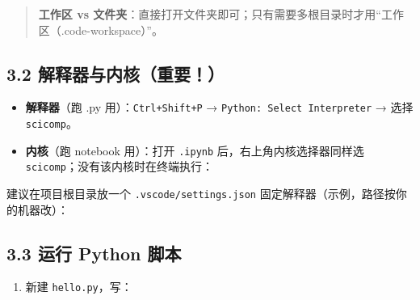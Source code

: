 \begin{quote}
\textbf{工作区 vs
文件夹}：直接打开文件夹即可；只有需要多根目录时才用``工作区（.code-workspace）''。
\end{quote}

\subsection{3.2
解释器与内核（重要！）}\label{ux89e3ux91caux5668ux4e0eux5185ux6838ux91cdux8981}

\begin{itemize}
\tightlist
\item
  \textbf{解释器}（跑 .py 用）：\texttt{Ctrl+Shift+P} →
  \texttt{Python:\ Select\ Interpreter} → 选择 \texttt{scicomp}。
\item
  \textbf{内核}（跑 notebook 用）：打开 \texttt{.ipynb}
  后，右上角内核选择器同样选 \texttt{scicomp}；没有该内核时在终端执行：
\end{itemize}

\begin{Shaded}
\begin{Highlighting}[]
\OperatorTok{{-}}\OperatorTok{{-}{-}}\OperatorTok{{-}{-}}
\end{Highlighting}
\end{Shaded}

建议在项目根目录放一个 \texttt{.vscode/settings.json}
固定解释器（示例，路径按你的机器改）：

\begin{Shaded}
\begin{Highlighting}[]
\FunctionTok{\{}
  \FunctionTok{:} \FunctionTok{,}
  \FunctionTok{:} \FunctionTok{,}
  \FunctionTok{:} 
\FunctionTok{\}}
\end{Highlighting}
\end{Shaded}

\subsection{3.3 运行 Python
脚本}\label{ux8fd0ux884c-python-ux811aux672c}

\begin{enumerate}
\def\labelenumi{\arabic{enumi}.}
\tightlist
\item
  新建 \texttt{hello.py}，写：
\end{enumerate}

